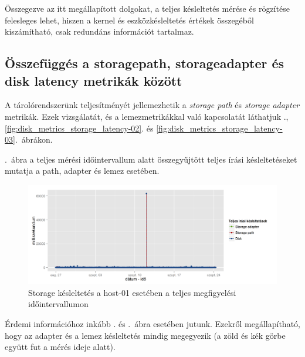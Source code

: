 \documentclass[a4paper,10pt,titlepage]{article}
\begin{document}
Összegezve az itt megállapított dolgokat, a teljes késleltetés mérése és rögzítése felesleges lehet, hiszen a kernel és eszközkésleltetés értékek összegéből kiszámítható, csak redundáns információt tartalmaz.

\clearpage

\subsection{Összefüggés a storagepath, storageadapter és disk latency metrikák között}

A tárolórendszerünk teljesítményét jellemezhetik a \textit{storage path} és \textit{storage adapter} metrikák. Ezek vizsgálatát, és a lemezmetrikákkal való kapcsolatát láthatjuk ., \ref{fig:disk_metrics_storage_latency-02}. és \ref{fig:disk_metrics_storage_latency-03}.~ábrákon.

.~ábra a teljes mérési időintervallum alatt összegyűjtött teljes írási késleltetéseket mutatja a path, adapter és lemez esetében. 

\begin{figure}[h!]
\centering
\includegraphics[width=1.00\textwidth]{figures/disk_metrics_storage_latency-20120826230140-20120924083120.png}
\caption{ Storage késleltetés a host-01 esetében a teljes megfigyelési időintervallumon \label{fig:disk_metrics_storage_latency-01}}
\end{figure}

Érdemi információhoz inkább . és .~ábra esetében jutunk. Ezekről megállapítható, hogy az adapter és a lemez késleltetés mindig megegyezik (a zöld és kék görbe együtt fut a mérés ideje alatt).
\end{document}
